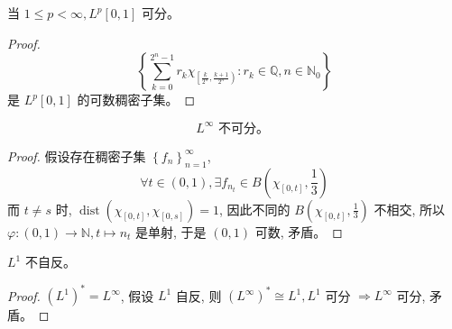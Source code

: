 \documentclass[lang=cn,newtx,10pt,scheme=chinese,thmcnt=chapter]{elegantbook}
\begin{document}
\begin{theorem}
当 $1 \leqslant p<\infty, L^p[0,1]$ 可分。

\end{theorem}
\begin{proof}
\begin{equation*}
\left\{\sum_{k=0}^{2^n-1} r_k \chi_{\left[\frac{k}{2^n}, \frac{k+1}{2^n}\right)}: r_k \in \mathbb{Q} , n \in \mathbb{N} _0\right\}
\end{equation*}
是 $L^p[0,1]$ 的可数稠密子集。
\end{proof}
\begin{theorem}
\begin{equation*}
L^{\infty} \text { 不可分。 }
\end{equation*}

\end{theorem}


\begin{proof}
假设存在稠密子集 $\left\{f_n\right\}_{n=1}^{\infty}$,
\begin{equation*}
\forall t \in(0,1), \exists f_{n_t} \in B\left(\chi_{[0, t]}, \frac{1}{3}\right)
\end{equation*}
而 $t \neq s$ 时, $\operatorname{dist}\left(\chi_{[0, t]}, \chi_{[0, s]}\right)=1$, 因此不同的 $B\left(\chi_{[0, t]}, \frac{1}{3}\right)$ 不相交, 所以 $\varphi:(0,1) \rightarrow \mathbb{N} , t \mapsto n_t$ 是单射, 于是 $(0,1)$ 可数, 矛盾。
\end{proof}

\begin{theorem}
$L^1$ 不自反。

\end{theorem}
\begin{proof}
 $\left(L^1\right)^*=L^{\infty}$, 假设 $L^1$ 自反, 则 $\left(L^{\infty}\right)^* \cong L^1, L^1$ 可分 $\Rightarrow L^{\infty}$ 可分, 矛盾。
\end{proof}
\end{document}
